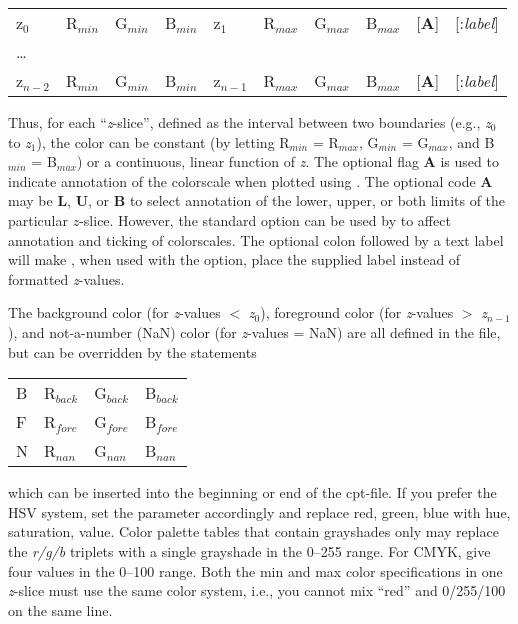\begin{center}
\begin{tabular}{llllllllll}
z$_0$ &  R$_{min}$ &  G$_{min}$ &  B$_{min}$ &  z$_1$ & R$_{max}$ &  G$_{max}$ &  B$_{max}$ &  [{\bf A}] & [:{\it label}] \\ 
\ldots & & & & & & & & & \\ 
z$_{n-2}$ &  R$_{min}$ &  G$_{min}$ &  B$_{min}$ &  z$_{n-1}$ &  R$_{max}$ &  G$_{max}$ &  B$_{max}$ &  [{\bf A}] & [:{\it label}]\\
\end{tabular} 
\end{center}

Thus, for each ``{\it z}-slice'', defined as the interval between two boundaries
(e.g., {\it z$_0$} to {\it z$_1$}), the color can be constant (by letting R$_{min}$
= R$_{max}$, G$_{min}$ = G$_{max}$, and B$_{min}$ = B$_{max}$) or a continuous,
linear function of {\it z}.  The optional flag {\bf A} is used to indicate annotation
of the colorscale when plotted using .  The optional code {\bf A} may be {\bf L},
{\bf U}, or {\bf B} to select annotation of the lower, upper, or both limits
of the particular $z$-slice.  However, the standard  option can be used
by  to affect annotation and ticking of colorscales.  The optional
colon followed by a text label will make , when used with the  option,
place the supplied label instead of formatted {\it z}-values.

The background color (for {\it z}-values $<$ {\it z$_0$}), foreground color
(for {\it z}-values $>$ {\it z$_{n-1}$}), and not-a-number (NaN) color (for
{\it z}-values = NaN) are all defined in the 
file, but can be overridden by the statements

\begin{center}
\begin{tabular}{llll}
B &  R$_{back}$ &  G$_{back}$ &  B$_{back}$ \\ 
F &  R$_{fore}$ &  G$_{fore}$ &  B$_{fore}$ \\ 
N &  R$_{nan}$ &  G$_{nan}$ &  B$_{nan}$ \\

\end{tabular}
\end{center}

\noindent
which can be inserted into the beginning or end of the cpt-file.  If
you prefer the HSV system, set the
 parameter accordingly and replace red, green,
blue with hue, saturation, value.  Color palette tables that contain
grayshades only may replace the {\it r/g/b} triplets with a single grayshade
in the 0--255 range.  For CMYK, give four values in the 0--100 range.
Both the min and max color specifications in one {\it z}-slice must use
the same color system, i.e., you cannot mix ``red'' and 0/255/100 on the
same line.


